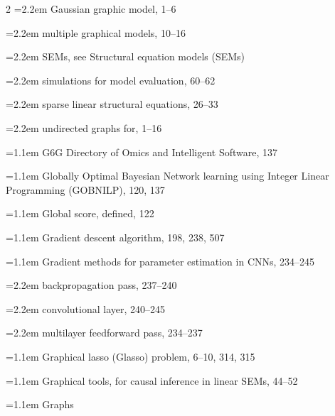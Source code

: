 \begin{multicols}{2}
\noindent\hangindent=2.2em \hspace*{1.1em}Gaussian graphic model, 1--6\par
\noindent\hangindent=2.2em \hspace*{1.1em}multiple graphical models, 10--16\par
\noindent\hangindent=2.2em \hspace*{1.1em}SEMs, see Structural equation models (SEMs)\par
\noindent\hangindent=2.2em \hspace*{1.1em}simulations for model evaluation, 60--62\par
\noindent\hangindent=2.2em \hspace*{1.1em}sparse linear structural equations, 26--33\par
\noindent\hangindent=2.2em \hspace*{1.1em}undirected graphs for, 1--16\par
\noindent\hangindent=1.1em G6G Directory of Omics and Intelligent Software, 137\par
\noindent\hangindent=1.1em Globally Optimal Bayesian Network learning using Integer Linear Programming (GOBNILP), 120, 137\par
\noindent\hangindent=1.1em Global score, defined, 122\par
\noindent\hangindent=1.1em Gradient descent algorithm, 198, 238, 507\par
\noindent\hangindent=1.1em Gradient methods for parameter estimation in CNNs, 234--245\par
\noindent\hangindent=2.2em \hspace*{1.1em}backpropagation pass, 237--240\par
\noindent\hangindent=2.2em \hspace*{1.1em}convolutional layer, 240--245\par
\noindent\hangindent=2.2em \hspace*{1.1em}multilayer feedforward pass, 234--237\par
\noindent\hangindent=1.1em Graphical lasso (Glasso) problem, 6--10, 314, 315\par
\noindent\hangindent=1.1em Graphical tools, for causal inference in linear SEMs, 44--52\par
\noindent\hangindent=1.1em Graphs\par

\end{multicols}
